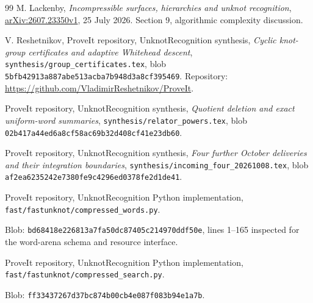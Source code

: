\documentclass[11pt,letterpaper]{article}
\theoremstyle{definition}
\begin{document}
\begin{thebibliography}{99}
M. Lackenby, \emph{Incompressible surfaces, hierarchies and unknot recognition},
\href{https://arxiv.org/abs/2607.23350v1}{arXiv:2607.23350v1},
25 July 2026. Section 9, algorithmic complexity discussion.

V. Reshetnikov, ProveIt repository, UnknotRecognition synthesis,
\emph{Cyclic knot-group certificates and adaptive Whitehead descent},
\texttt{synthesis/group\_certificates.tex}, blob
\texttt{5bfb42913a887abe513acba7b948d3a8cf395469}.
Repository: \url{https://github.com/VladimirReshetnikov/ProveIt}.

ProveIt repository, UnknotRecognition synthesis,
\emph{Quotient deletion and exact uniform-word summaries},
\texttt{synthesis/relator\_powers.tex}, blob
\texttt{02b417a44ed6a8cf58ac69b32d408cf41e23db60}.

ProveIt repository, UnknotRecognition synthesis,
\emph{Four further October deliveries and their integration boundaries},
\texttt{synthesis/incoming\_four\_20261008.tex}, blob
\texttt{af2ea6235242e7380fe9c4296ed0378fe2d1de41}.

ProveIt repository, UnknotRecognition Python implementation,
\texttt{fast/fastunknot/compressed\_words.py}.\par\noindent Blob: \texttt{bd68418e226813a7fa50dc87405c214970ddf50e},
lines 1--165 inspected for the word-arena schema and resource interface.

ProveIt repository, UnknotRecognition Python implementation,
\texttt{fast/fastunknot/compressed\_search.py}.\par\noindent Blob: \texttt{ff33437267d37bc874b00cb4e087f083b94e1a7b}.
\end{thebibliography}
\end{document}
